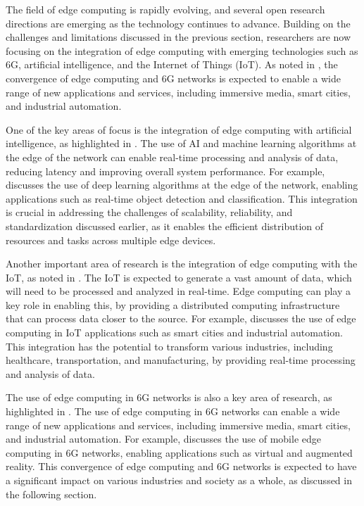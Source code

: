 \documentclass[11pt]{article}
\begin{document}
The field of edge computing is rapidly evolving, and several open research directions are emerging as the technology continues to advance. Building on the challenges and limitations discussed in the previous section, researchers are now focusing on the integration of edge computing with emerging technologies such as 6G, artificial intelligence, and the Internet of Things (IoT). As noted in \cite{ref207}, the convergence of edge computing and 6G networks is expected to enable a wide range of new applications and services, including immersive media, smart cities, and industrial automation.

One of the key areas of focus is the integration of edge computing with artificial intelligence, as highlighted in \cite{ref28}. The use of AI and machine learning algorithms at the edge of the network can enable real-time processing and analysis of data, reducing latency and improving overall system performance. For example, \cite{ref7} discusses the use of deep learning algorithms at the edge of the network, enabling applications such as real-time object detection and classification. This integration is crucial in addressing the challenges of scalability, reliability, and standardization discussed earlier, as it enables the efficient distribution of resources and tasks across multiple edge devices.

Another important area of research is the integration of edge computing with the IoT, as noted in \cite{ref24}. The IoT is expected to generate a vast amount of data, which will need to be processed and analyzed in real-time. Edge computing can play a key role in enabling this, by providing a distributed computing infrastructure that can process data closer to the source. For example, \cite{ref3} discusses the use of edge computing in IoT applications such as smart cities and industrial automation. This integration has the potential to transform various industries, including healthcare, transportation, and manufacturing, by providing real-time processing and analysis of data.

The use of edge computing in 6G networks is also a key area of research, as highlighted in \cite{ref208}. The use of edge computing in 6G networks can enable a wide range of new applications and services, including immersive media, smart cities, and industrial automation. For example, \cite{ref209} discusses the use of mobile edge computing in 6G networks, enabling applications such as virtual and augmented reality. This convergence of edge computing and 6G networks is expected to have a significant impact on various industries and society as a whole, as discussed in the following section.
\end{document}
